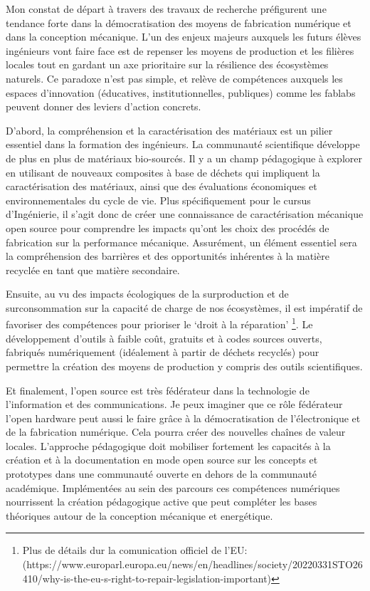 \documentclass[
  11pt,
]{article}
\begin{document}
Mon constat de départ à travers des travaux de recherche préfigurent une
tendance forte dans la démocratisation des moyens de fabrication
numérique et dans la conception mécanique. L'un des enjeux majeurs
auxquels les futurs élèves ingénieurs vont faire face est de repenser
les moyens de production et les filières locales tout en gardant un axe
prioritaire sur la résilience des écosystèmes naturels. Ce paradoxe
n'est pas simple, et relève de compétences auxquels les espaces
d'innovation (éducatives, institutionnelles, publiques) comme les
fablabs peuvent donner des leviers d'action concrets.

D'abord, la compréhension et la caractérisation des matériaux est un
pilier essentiel dans la formation des ingénieurs. La communauté
scientifique développe de plus en plus de matériaux bio-sourcés. Il y a
un champ pédagogique à explorer en utilisant de nouveaux composites à
base de déchets qui impliquent la caractérisation des matériaux, ainsi
que des évaluations économiques et environnementales du cycle de vie.
Plus spécifiquement pour le cursus d'Ingénierie, il s'agit donc de créer
une connaissance de caractérisation mécanique open source pour
comprendre les impacts qu'ont les choix des procédés de fabrication sur
la performance mécanique. Assurément, un élément essentiel sera la
compréhension des barrières et des opportunités inhérentes à la matière
recyclée en tant que matière secondaire.

Ensuite, au vu des impacts écologiques de la surproduction et de
surconsommation sur la capacité de charge de nos écosystèmes, il est
impératif de favoriser des compétences pour prioriser le `droit à la
réparation' \footnote{Plus de détails dur la comunication officiel de
  l'EU:
  (https://www.europarl.europa.eu/news/en/headlines/society/20220331STO26410/why-is-the-eu-s-right-to-repair-legislation-important)}.
Le développement d'outils à faible coût, gratuits et à codes sources
ouverts, fabriqués numériquement (idéalement à partir de déchets
recyclés) pour permettre la création des moyens de production y compris
des outils scientifiques.

Et finalement, l'open source est très fédérateur dans la technologie de
l'information et des communications. Je peux imaginer que ce rôle
fédérateur l'open hardware peut aussi le faire grâce à la
démocratisation de l'électronique et de la fabrication numérique. Cela
pourra créer des nouvelles chaînes de valeur locales. L'approche
pédagogique doit mobiliser fortement les capacités à la création et à la
documentation en mode open source sur les concepts et prototypes dans
une communauté ouverte en dehors de la communauté académique.
Implémentées au sein des parcours ces compétences numériques nourrissent
la création pédagogique active que peut compléter les bases théoriques
autour de la conception mécanique et energétique.
\end{document}
